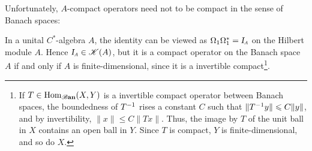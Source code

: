 Unfortunately, $A$-compact operators need not to be compact in the sense of Banach spaces:

\begin{contraexemplo}
In a unital $C^*$-algebra $A$, the identity can be viewed as $\Omega_1 \Omega_1^* = \sub \Id A$ on the Hilbert module $A$. Hence $\sub \Id A \in \mathscr K(A)$, but it is a compact operator on the Banach space $A$ if and only if $A$ is finite-dimensional, since it is a invertible compact\footnote{If $T \in \operatorname{Hom}_{\boldsymbol{\mathscr B}\textbf{an}}(X,Y)$ is a invertible compact operator between Banach spaces, the boundedness of ${T}^{-1}$ rises a constant $C$ such that $\|{T}^{-1}y\| \leqslant C\|y\|$, and by invertibility, $\|x\|\leqslant C\|Tx\|$. Thus, the image by $T$ of the unit ball in $X$ contains an open ball in $Y$. Since $T$ is compact, $Y$ is
finite-dimensional, and so do $X$.}. 
\end{contraexemplo}


